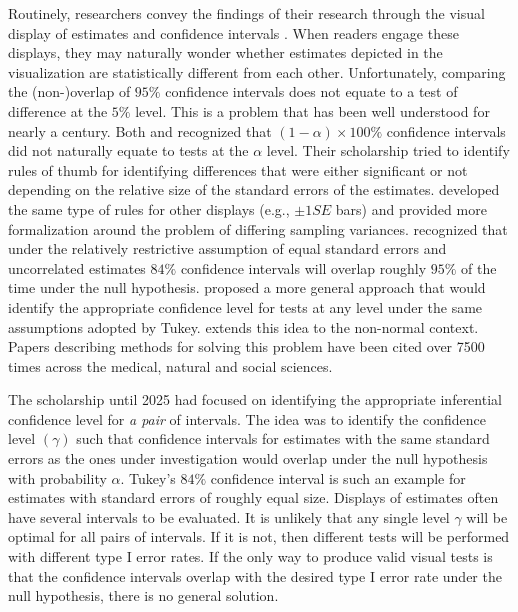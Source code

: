 Routinely, researchers convey the findings of their research through the visual display of estimates and confidence intervals \citep{few12b, kastellec07}. When readers engage these displays, they may naturally wonder whether estimates depicted in the visualization are statistically different from each other. Unfortunately, comparing the (non-)overlap of \(95\%\) confidence intervals does not equate to a test of difference at the \(5\%\) level. This is a problem that has been well understood for nearly a century. Both \citet{dice_1936} and \citet{simpson1939} recognized that \((1-\alpha)\times 100\%\) confidence intervals did not naturally equate to tests at the \(\alpha\) level. Their scholarship tried to identify rules of thumb for identifying differences that were either significant or not depending on the relative size of the standard errors of the estimates. \citet{browne79} developed the same type of rules for other displays (e.g., \(\pm 1SE\) bars) and provided more formalization around the problem of differing sampling variances. \citet{tukey1991} recognized that under the relatively restrictive assumption of equal standard errors and uncorrelated estimates \(84\%\) confidence intervals will overlap roughly \(95\%\) of the time under the null hypothesis. \citet{godlstein_healey_95} proposed a more general approach that would identify the appropriate confidence level for tests at any level under the same assumptions adopted by Tukey. \citet{payton_2003} extends this idea to the non-normal context. Papers describing methods for solving this problem have been cited over 7500 times across the medical, natural and social sciences.

The scholarship until 2025 had focused on identifying the appropriate inferential confidence level for \emph{a pair} of intervals. The idea was to identify the confidence level \((\gamma)\) such that confidence intervals for estimates with the same standard errors as the ones under investigation would overlap under the null hypothesis with probability \(\alpha\). Tukey's \(84\%\) confidence interval is such an example for estimates with standard errors of roughly equal size. Displays of estimates often have several intervals to be evaluated. It is unlikely that any single level \(\gamma\) will be optimal for all pairs of intervals. If it is not, then different tests will be performed with different type I error rates. If the only way to produce valid visual tests is that the confidence intervals overlap with the desired type I error rate under the null hypothesis, there is no general solution.

